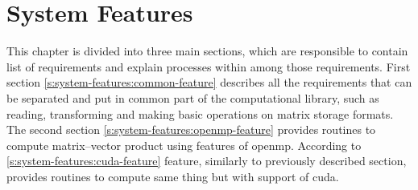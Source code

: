 \chapter{System Features} \label{chp:system-features}
	\begin{comment}
		$<$This template illustrates organizing the functional requirements for the 
		product by system features, the major services provided by the product. You may 
		prefer to organize this section by use case, mode of operation, user class, 
		object class, functional hierarchy, or combinations of these, whatever makes the 
		most logical sense for your product.$>$
	\end{comment}
	
	This chapter is divided into three main sections, which are responsible to contain list of requirements and explain processes within among those requirements. First section \ref{s:system-features:common-feature} describes all the requirements that can be separated and put in common part of the computational library, such as reading, transforming and making basic operations on matrix storage formats. The second section \ref{s:system-features:openmp-feature} provides routines to compute matrix--vector product using features of \gls{openmp}. According to \ref{s:system-features:cuda-feature} feature, similarly to previously described section, provides routines to compute same thing but with support of \gls{cuda}. 
	
	
	
	